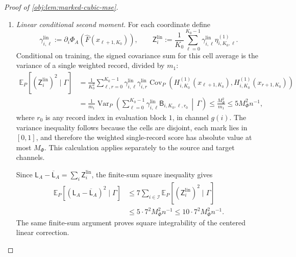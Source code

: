\documentclass[11pt]{article}
\begin{document}
\begin{proof}[Proof of \cref{obj:lem:marked-cubic-mse}]
\begin{enumerate}
\item \textit{Linear conditional second moment.}
For each coordinate define
\[
\gamma^{\mathrm{lin}}_{i,\ell}
:=\partial_i\Phi_A(\widehat F(x_{\ell+1,K_0})),
\qquad
\mathsf Z^{\mathrm{lin}}_i
:=\frac1{K_0}\sum_{\ell=0}^{K_0-1}
\gamma^{\mathrm{lin}}_{i,\ell}\eta^{(1)}_{i,K_0,\ell}.
\]
Conditional on training, the signed covariance sum for this cell average is the variance of a single weighted record, divided by \(m_1\):
\[
\begin{aligned}
\mathbb E_P[(\mathsf Z^{\mathrm{lin}}_i)^2\mid\Gamma]
&=
\frac1{K_0^2}\sum_{\ell,r=0}^{K_0-1}
\gamma^{\mathrm{lin}}_{i,\ell}\gamma^{\mathrm{lin}}_{i,r}
\operatorname{Cov}_P\!\left(
H_{i,K_0}^{(1)}(x_{\ell+1,K_0}),
H_{i,K_0}^{(1)}(x_{r+1,K_0})
\right)\\
&=
\frac1{m_1}
\operatorname{Var}_P\!\left(
\sum_{\ell=0}^{K_0-1}
\gamma^{\mathrm{lin}}_{i,\ell}
\mathsf B_{i,K_0,\ell,r_0}
\,\middle|\,\Gamma
\right)
\le\frac{M_\Phi^2}{m_1}
\le5M_\Phi^2n^{-1},
\end{aligned}
\]
where \(r_0\) is any record index in evaluation block \(1\), in channel \(g(i)\). The variance inequality follows because the cells are disjoint, each mark lies in \([0,1]\), and therefore the weighted single-record score has absolute value at most \(M_\Phi\). This calculation applies separately to the source and target channels.

Since \(\mathsf L_A-\overline{\mathsf L}_A=\sum_i\mathsf Z_i^{\mathrm{lin}}\), the finite-sum square inequality gives
\[
\begin{aligned}
\mathbb E_P[(\mathsf L_A-\overline{\mathsf L}_A)^2\mid\Gamma]
&\le7\sum_{i\in\mathcal I}
\mathbb E_P[(\mathsf Z_i^{\mathrm{lin}})^2\mid\Gamma]\\
&\le5\cdot7^2M_\Phi^2n^{-1}
\le10\cdot7^2M_\Phi^2n^{-1}.
\end{aligned}
\]
The same finite-sum argument proves square integrability of the centered linear correction.


\end{enumerate}
\end{proof}
\end{document}
